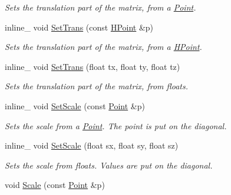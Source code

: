 \begin{DoxyCompactItemize}
\begin{DoxyCompactList}\small\item\em Sets the translation part of the matrix, from a \hyperlink{classPoint}{Point}. \end{DoxyCompactList}\item 
inline\+\_\+ void \hyperlink{classMatrix4x4_a8eb35a06a0ebcc627400e28b078be014}{Set\+Trans} (const \hyperlink{classHPoint}{H\+Point} \&p)\hypertarget{classMatrix4x4_a8eb35a06a0ebcc627400e28b078be014}{}\label{classMatrix4x4_a8eb35a06a0ebcc627400e28b078be014}

\begin{DoxyCompactList}\small\item\em Sets the translation part of the matrix, from a \hyperlink{classHPoint}{H\+Point}. \end{DoxyCompactList}\item 
inline\+\_\+ void \hyperlink{classMatrix4x4_ac32b709a0cdad07a3f81194cad4fa617}{Set\+Trans} (float tx, float ty, float tz)\hypertarget{classMatrix4x4_ac32b709a0cdad07a3f81194cad4fa617}{}\label{classMatrix4x4_ac32b709a0cdad07a3f81194cad4fa617}

\begin{DoxyCompactList}\small\item\em Sets the translation part of the matrix, from floats. \end{DoxyCompactList}\item 
inline\+\_\+ void \hyperlink{classMatrix4x4_a3b2357c0ca9ecde2ceb834fd067d2124}{Set\+Scale} (const \hyperlink{classPoint}{Point} \&p)\hypertarget{classMatrix4x4_a3b2357c0ca9ecde2ceb834fd067d2124}{}\label{classMatrix4x4_a3b2357c0ca9ecde2ceb834fd067d2124}

\begin{DoxyCompactList}\small\item\em Sets the scale from a \hyperlink{classPoint}{Point}. The point is put on the diagonal. \end{DoxyCompactList}\item 
inline\+\_\+ void \hyperlink{classMatrix4x4_a38e74ddf318a3fa279522cf646174daa}{Set\+Scale} (float sx, float sy, float sz)\hypertarget{classMatrix4x4_a38e74ddf318a3fa279522cf646174daa}{}\label{classMatrix4x4_a38e74ddf318a3fa279522cf646174daa}

\begin{DoxyCompactList}\small\item\em Sets the scale from floats. Values are put on the diagonal. \end{DoxyCompactList}\item 
void \hyperlink{classMatrix4x4_aaeba89274dce846ba331e1cbd7c84ecb}{Scale} (const \hyperlink{classPoint}{Point} \&p)\hypertarget{classMatrix4x4_aaeba89274dce846ba331e1cbd7c84ecb}{}\label{classMatrix4x4_aaeba89274dce846ba331e1cbd7c84ecb}


\end{DoxyCompactItemize}
